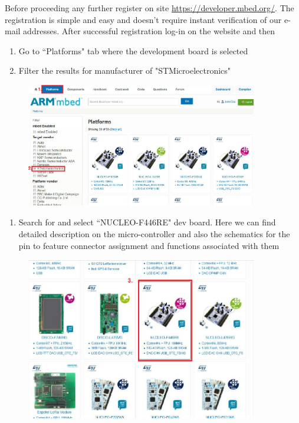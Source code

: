 \documentclass[a4paper]{article}
\begin{document}
Before proceeding any further register on site \url{https://developer.mbed.org/}. The registration is simple and easy and doesn't require instant verification of our e-mail addresses. After successful registration log-in on the website and then
\begin{enumerate}
  \item Go to ``Platforms" tab where the development board is selected
  \item Filter the results for manufacturer of "STMicroelectronics"
\end{enumerate}
\begin{figure}[H]
    \centering
    \includegraphics[width=0.9\textwidth]{figures/mbed-platform.png}
\end{figure}
\begin{enumerate}[resume]
\item Search for and select ``NUCLEO-F446RE" dev board. Here we can find detailed description on the micro-controller and also the schematics for the pin to feature connector assignment and functions associated with them
\end{enumerate}
\begin{figure}[H]
    \centering
    \includegraphics[width=0.9\textwidth]{figures/mbed-nucleo.png}
\end{figure}
\end{document}
